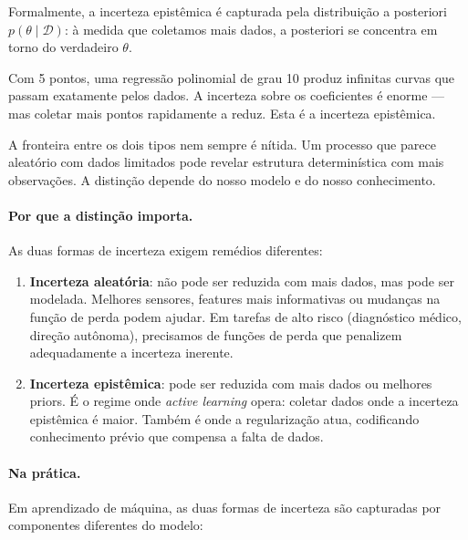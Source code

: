 \documentclass{tufte-handout}
\begin{document}
Formalmente, a incerteza epistêmica é capturada pela distribuição a posteriori
$p(\theta \mid \mathcal{D})$: à medida que coletamos mais dados, a posteriori se
concentra em torno do verdadeiro $\theta$.

\begin{exmp}
    Com 5 pontos, uma regressão polinomial de grau 10 produz infinitas curvas que
    passam exatamente pelos dados. A incerteza sobre os coeficientes é enorme --- mas
    coletar mais pontos rapidamente a reduz. Esta é a incerteza epistêmica.
\end{exmp}

\begin{remark}
    A fronteira entre os dois tipos nem sempre é nítida. Um processo que parece
    aleatório com dados limitados pode revelar estrutura determinística com mais
    observações. A distinção depende do nosso modelo e do nosso conhecimento.
\end{remark}

\paragraph{Por que a distinção importa.}

As duas formas de incerteza exigem remédios diferentes:

\begin{enumerate}
    \item \textbf{Incerteza aleatória}: não pode ser reduzida com mais dados, mas pode
    ser modelada. Melhores sensores, features mais informativas ou mudanças na função
    de perda podem ajudar. Em tarefas de alto risco (diagnóstico médico, direção
    autônoma), precisamos de funções de perda que penalizem adequadamente a
    incerteza inerente.
    \item \textbf{Incerteza epistêmica}: pode ser reduzida com mais dados ou melhores
    priors. É o regime onde \textit{active learning} opera: coletar dados onde a
    incerteza epistêmica é maior. Também é onde a regularização atua, codificando
    conhecimento prévio que compensa a falta de dados.
\end{enumerate}

\paragraph{Na prática.}

Em aprendizado de máquina, as duas formas de incerteza são capturadas por componentes
diferentes do modelo:
\end{document}
